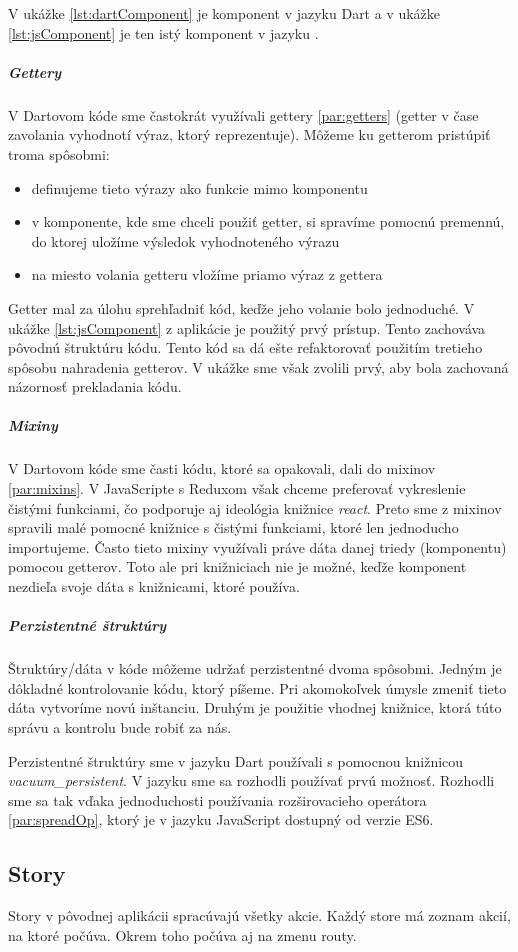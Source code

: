 V ukážke \ref{lst:dartComponent} je komponent v jazyku Dart a v ukážke \ref{lst:jsComponent} je ten istý komponent v jazyku \JS{}.

\subparagraph{Gettery} \NEW{}
V Dartovom kóde sme častokrát využívali gettery \ref{par:getters} (getter v čase zavolania vyhodnotí výraz, ktorý reprezentuje). Môžeme ku getterom pristúpiť troma spôsobmi: 
\begin{itemize}
  \item definujeme tieto výrazy ako funkcie mimo komponentu
  \item v komponente, kde sme chceli použiť getter, si spravíme pomocnú premennú, do ktorej uložíme výsledok vyhodnoteného výrazu
  \item na miesto volania getteru vložíme priamo výraz z gettera
\end{itemize}

Getter mal za úlohu sprehľadniť kód, keďže jeho volanie bolo jednoduché.
V ukážke \ref{lst:jsComponent} z aplikácie je použitý prvý prístup. Tento zachováva pôvodnú štruktúru kódu. Tento kód sa dá ešte refaktorovať použitím tretieho spôsobu nahradenia getterov. V ukážke sme však zvolili prvý, aby bola zachovaná názornosť prekladania kódu.

\subparagraph{Mixiny}
V Dartovom kóde sme časti kódu, ktoré sa opakovali, dali do mixinov \ref{par:mixins}. V JavaScripte s Reduxom však chceme preferovať vykreslenie čistými funkciami, čo podporuje aj ideológia knižnice \emph{react}. Preto sme z mixinov spravili malé pomocné knižnice s čistými funkciami, ktoré len jednoducho importujeme. Často tieto mixiny využívali práve dáta danej triedy (komponentu) pomocou getterov. Toto ale pri knižniciach nie je možné, keďže komponent nezdieľa svoje dáta s knižnicami, ktoré používa.

\subparagraph{Perzistentné štruktúry} \NEW{}
Štruktúry/dáta v kóde môžeme udržať perzistentné dvoma spôsobmi. 
Jedným je dôkladné kontrolovanie kódu, ktorý píšeme. Pri akomokoľvek úmysle zmeniť tieto dáta vytvoríme novú inštanciu.
Druhým je použitie vhodnej knižnice, ktorá túto správu a kontrolu bude robiť za nás.

Perzistentné štruktúry sme v jazyku Dart používali s pomocnou knižnicou \emph{vacuum\_persistent}. V jazyku \JS{} sme sa rozhodli používať prvú možnosť. Rozhodli sme sa tak vďaka jednoduchosti používania rozširovacieho operátora \ref{par:spreadOp}, ktorý je v jazyku JavaScript dostupný od verzie ES6.

\subsection{Story}
Story v pôvodnej aplikácii spracúvajú všetky akcie. Každý store má zoznam akcií, na ktoré počúva. Okrem toho počúva aj na zmenu routy.

